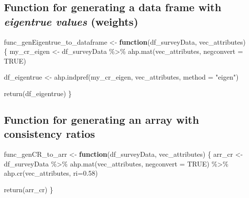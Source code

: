 \documentclass[
]{article}
\newenvironment{Shaded}{\begin{snugshade}}{\end{snugshade}}
\newcommand{\AttributeTok}[1]{\textcolor[rgb]{0.00,0.34,0.68}{#1}}
\newcommand{\ConstantTok}[1]{\textcolor[rgb]{0.67,0.33,0.00}{#1}}
\newcommand{\ControlFlowTok}[1]{\textcolor[rgb]{0.12,0.11,0.11}{\textbf{#1}}}
\newcommand{\FloatTok}[1]{\textcolor[rgb]{0.69,0.50,0.00}{#1}}
\newcommand{\FunctionTok}[1]{\textcolor[rgb]{0.39,0.29,0.61}{#1}}
\newcommand{\NormalTok}[1]{\textcolor[rgb]{0.12,0.11,0.11}{#1}}
\newcommand{\OtherTok}[1]{\textcolor[rgb]{0.00,0.43,0.16}{#1}}
\newcommand{\SpecialCharTok}[1]{\textcolor[rgb]{0.24,0.68,0.91}{#1}}
\newcommand{\StringTok}[1]{\textcolor[rgb]{0.75,0.01,0.01}{#1}}
\begin{document}
\hypertarget{function-for-generating-a-data-frame-with-eigentrue-values-weights}{%
\subsection{\texorpdfstring{Function for generating a data frame with
\emph{eigentrue values}
(weights)}{Function for generating a data frame with eigentrue values (weights)}}\label{function-for-generating-a-data-frame-with-eigentrue-values-weights}}

\begin{Shaded}
\begin{Highlighting}[]
\NormalTok{func\_genEigentrue\_to\_dataframe }\OtherTok{\textless{}{-}} \ControlFlowTok{function}\NormalTok{(df\_surveyData, vec\_attributes) \{}
\NormalTok{  my\_cr\_eigen }\OtherTok{\textless{}{-}}\NormalTok{ df\_surveyData }\SpecialCharTok{\%\textgreater{}\%} 
    \FunctionTok{ahp.mat}\NormalTok{(vec\_attributes, }\AttributeTok{negconvert =} \ConstantTok{TRUE}\NormalTok{)}
  
\NormalTok{  df\_eigentrue }\OtherTok{\textless{}{-}} \FunctionTok{ahp.indpref}\NormalTok{(my\_cr\_eigen, vec\_attributes, }\AttributeTok{method =} \StringTok{"eigen"}\NormalTok{)}

  \FunctionTok{return}\NormalTok{(df\_eigentrue)}
\NormalTok{\}}
\end{Highlighting}
\end{Shaded}

\hypertarget{function-for-generating-an-array-with-consistency-ratios}{%
\subsection{Function for generating an array with consistency
ratios}\label{function-for-generating-an-array-with-consistency-ratios}}

\begin{Shaded}
\begin{Highlighting}[]
\NormalTok{func\_genCR\_to\_arr }\OtherTok{\textless{}{-}} \ControlFlowTok{function}\NormalTok{(df\_surveyData, vec\_attributes) \{}
\NormalTok{  arr\_cr }\OtherTok{\textless{}{-}}\NormalTok{ df\_surveyData }\SpecialCharTok{\%\textgreater{}\%}
    \FunctionTok{ahp.mat}\NormalTok{(vec\_attributes, }\AttributeTok{negconvert =} \ConstantTok{TRUE}\NormalTok{) }\SpecialCharTok{\%\textgreater{}\%} 
    \FunctionTok{ahp.cr}\NormalTok{(vec\_attributes, }\AttributeTok{ri=}\FloatTok{0.58}\NormalTok{)}

  \FunctionTok{return}\NormalTok{(arr\_cr)}
\NormalTok{\}}
\end{Highlighting}
\end{Shaded}
\end{document}
